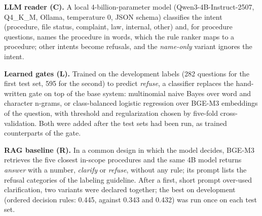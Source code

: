 \textbf{LLM reader (C).} A local 4-billion-parameter model (Qwen3-4B-Instruct-2507, Q4\_K\_M, Ollama, temperature 0, JSON
schema)\cite{qwen3,qwen3inst} classifies the intent (procedure, file status, complaint, law, internal, other) and, for procedure
questions, names the procedure in words, which the rule ranker maps to a procedure; other intents become refusals, and the \emph{name-only}
variant ignores the intent.

\textbf{Learned gates (L).} Trained on the development labels (282 questions for the first test set, 595 for the second) to predict
\emph{refuse}, a classifier replaces the hand-written gate on top of the base system: multinomial naive Bayes over word and character
n-grams, or class-balanced logistic regression over BGE-M3 embeddings of the question, with threshold and regularization chosen by
five-fold cross-validation. Both were added after the test sets had been run, as trained counterparts of the gate.

\textbf{RAG baseline (R).} In a common design in which the model decides, BGE-M3 retrieves the five closest in-scope procedures and the same
4B model returns \emph{answer} with a number, \emph{clarify} or \emph{refuse}, without any rule; its prompt lists the refusal categories of
the labeling guideline. After a first, short prompt over-used clarification, two variants were declared together; the best on development
(ordered decision rules: 0.445, against 0.343 and 0.432) was run once on each test set.
